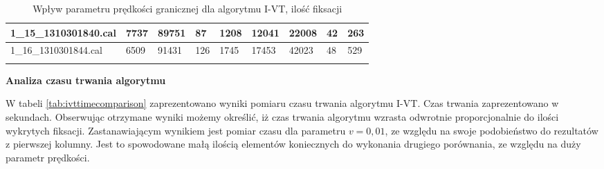 {\begin{longtable}{l|l|l|l|l|l|l|l|l|}
    \multicolumn{1}{|l|}{1\_15\_1310301840.cal} & 7737 & \cellcolor[HTML]{EFEFEF}89751 & 87 & \cellcolor[HTML]{EFEFEF}1208 & 12041 & \cellcolor[HTML]{EFEFEF}22008 & 42 & \cellcolor[HTML]{EFEFEF}263 \\ \hline
    \multicolumn{1}{|l|}{1\_16\_1310301844.cal} & 6509 & \cellcolor[HTML]{EFEFEF}91431 & 126 & \cellcolor[HTML]{EFEFEF}1745 & 17453 & \cellcolor[HTML]{EFEFEF}42023 & 48 & \cellcolor[HTML]{EFEFEF}529 \\ \hline
    \caption{Wpływ parametru prędkości granicznej dla algorytmu I-VT, ilość fiksacji}
    \label{tab:ivtfixationcomparison}\\
\end{longtable}
}
\textbf{Analiza czasu trwania algorytmu}\par
W tabeli \ref{tab:ivttimecomparison} zaprezentowano wyniki pomiaru czasu trwania algorytmu I-VT. Czas trwania zaprezentowano w sekundach. Obserwując otrzymane wyniki możemy określić, iż czas trwania algorytmu wzrasta odwrotnie proporcjonalnie do ilości wykrytych fiksacji. Zastanawiającym wynikiem jest pomiar czasu dla parametru $v = 0,01$, ze względu na swoje podobieństwo do rezultatów z pierwszej kolumny. Jest to spowodowane małą ilością elementów koniecznych do wykonania drugiego porównania, ze względu na duży parametr prędkości.\par
